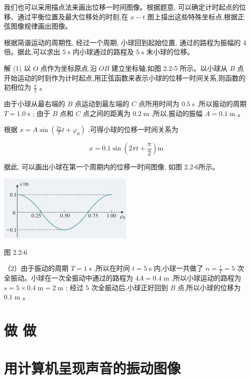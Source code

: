 \documentclass[10pt]{article}
\begin{document}
我们也可以采用描点法来画出位移一时间图像。根据题意, 可以确定计时起点的位移、通过平衡位置及最大位移处的时刻,在 \(x - t\) 图上描出这些特殊坐标点,根据正弦图像规律画出图像。

根据简谐运动的周期性, 经过一个周期, 小球回到起始位置, 通过的路程为振幅的 4 倍。据此,可以求出 \(5\mathrm{\;s}\) 内小球通过的路程及 \(5\mathrm{\;s}\) 末小球的位移。

解 (1) 以 \(O\) 点作为坐标原点,沿 \({OB}\) 建立坐标轴,如图 2.2-5 所示。以小球从 \(B\) 点开始运动的时刻作为计时起点,用正弦函数来表示小球的位移一时间关系,则函数的初相位为 \(\frac{\pi }{2}\) 。

由于小球从最右端的 \(B\) 点运动到最左端的 \(C\) 点所用时间为 \({0.5}\mathrm{\;s}\) ,所以振动的周期 \(T = {1.0}\mathrm{\;s}\) ; 由于 \(B\) 点和 \(C\) 点之间的距离为 \({0.2}\mathrm{\;m}\) ,所以,振动的振幅 \(A = {0.1}\mathrm{\;m}\) 。

根据 \(x = A\sin \left( {\frac{2\pi }{T}t + {\varphi }_{0}}\right)\) ,可得小球的位移一时间关系为

\[
x = {0.1}\sin \left( {{2\pi t} + \frac{\pi }{2}}\right) \mathrm{m}
\]

据此, 可以画出小球在第一个周期内的位移一时间图像, 如图 2.2-6所示。

\begin{center}
\includegraphics[max width=0.5\textwidth]{images/01910e4c-ebb8-7d2c-8f2f-2375bc1d2d12_45_434197.jpg}
\end{center}

图 2.2-6

（2）由于振动的周期 \(T = 1\mathrm{\;s}\) ,所以在时间 \(t = 5\mathrm{\;s}\) 内,小球一共做了 \(n = \frac{t}{T} = 5\) 次全振动。小球在一次全振动中通过的路程为 \({4A} = {0.4}\mathrm{\;m}\) ,所以小球运动的路程为 \(s = 5 \times {0.4}\mathrm{\;m} = 2\mathrm{\;m}\) ; 经过 5 次全振动后,小球正好回到 \(B\) 点,所以小球的位移为 \({0.1}\mathrm{\;m}\) 。

\section*{做 做}

\section*{用计算机呈现声音的振动图像}
\end{document}
